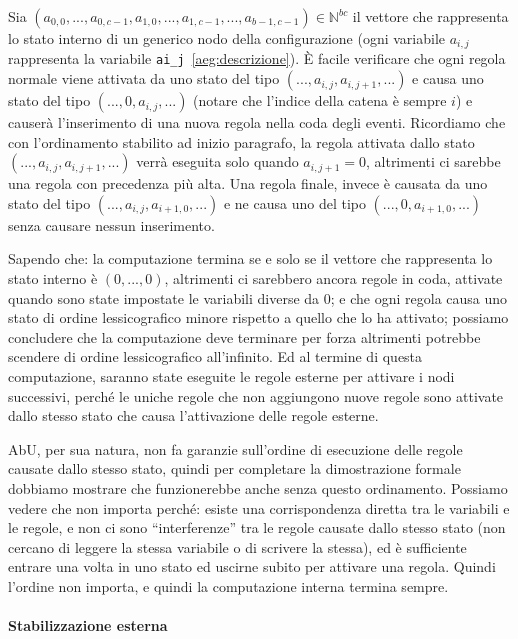 \documentclass[12pt, a4paper]{article}
\begin{document}
    Sia $(a_{0,0},...,a_{0,c-1},a_{1,0},...,a_{1,c-1},...,a_{b-1,c-1})\in \mathbb{N}^{bc}$ il vettore che rappresenta lo stato interno di un generico nodo della configurazione (ogni variabile $a_{i,j}$ rappresenta la variabile \lstinline{ai_j}~\ref{aeg:descrizione}). È facile verificare che ogni regola normale viene attivata da uno stato del tipo $(...,a_{i,j},a_{i,j+1},...)$ e causa uno stato del tipo $(...,0,a_{i,j},...)$ (notare che l'indice della catena è sempre $i$) e causerà l'inserimento di una nuova regola nella coda degli eventi.
    Ricordiamo che con l'ordinamento stabilito ad inizio paragrafo, la regola attivata dallo stato $(...,a_{i,j},a_{i,j+1},...)$ verrà eseguita solo quando $a_{i,j+1}=0$, altrimenti ci sarebbe una regola con precedenza più alta.
    Una regola finale, invece è causata da uno stato del tipo $(...,a_{i,j},a_{i+1,0},...)$ e ne causa uno del tipo $(...,0,a_{i+1,0},...)$ senza causare nessun inserimento.

    Sapendo che: la computazione termina se e solo se il vettore che rappresenta lo stato interno è $(0,...,0)$, altrimenti ci sarebbero ancora regole in coda, attivate quando sono state impostate le variabili diverse da $0$; e che ogni regola causa uno stato di ordine lessicografico minore rispetto a quello che lo ha attivato; possiamo concludere che la computazione deve terminare per forza altrimenti potrebbe scendere di ordine lessicografico all'infinito.
    Ed al termine di questa computazione, saranno state eseguite le regole esterne per attivare i nodi successivi, perché le uniche regole che non aggiungono nuove regole sono attivate dallo stesso stato che causa l'attivazione delle regole esterne.

    AbU, per sua natura, non fa garanzie sull'ordine di esecuzione delle regole causate dallo stesso stato, quindi per completare la dimostrazione formale dobbiamo mostrare che funzionerebbe anche senza questo ordinamento.
    Possiamo vedere che non importa perché: esiste una corrispondenza diretta tra le variabili e le regole, e non ci sono ``interferenze'' tra le regole causate dallo stesso stato (non cercano di leggere la stessa variabile o di scrivere la stessa), ed è sufficiente entrare una volta in uno stato ed uscirne subito per attivare una regola.
    Quindi l'ordine non importa, e quindi la computazione interna termina sempre.\label{terminazione:interna:ordinamento}

    \paragraph{Stabilizzazione esterna}
\end{document}
